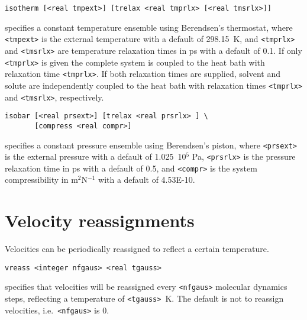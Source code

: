 \begin{description}

\item
\begin{verbatim}
isotherm [<real tmpext>] [trelax <real tmprlx> [<real tmsrlx>]]
\end{verbatim}
specifies a constant temperature ensemble using Berendsen's thermostat,
where \verb+<tmpext>+ is the external temperature with a default of 298.15~K,
and \verb+<tmprlx>+ and \verb+<tmsrlx>+ are temperature relaxation times in ps 
with a default of 0.1. If only \verb+<tmprlx>+ is given the complete system
is coupled to the heat bath with relaxation time \verb+<tmprlx>+. If both
relaxation times are supplied, solvent and solute are independently coupled
to the heat bath with relaxation times \verb+<tmprlx>+ and \verb+<tmsrlx>+,
respectively.

\item
\begin{verbatim}
isobar [<real prsext>] [trelax <real prsrlx> ] \
       [compress <real compr>]
\end{verbatim}
specifies a constant pressure ensemble using Berendsen's piston,
where \verb+<prsext>+ is the external pressure with a default of 1.025~10$^5$ Pa,
\verb+<prsrlx>+ is the pressure relaxation time in ps with a default of 0.5, and
\verb+<compr>+ is the system compressibility in m$^2$N$^{-1}$ with a
default of 4.53E-10.
\end{description}

\section{Velocity reassignments}
Velocities can be periodically reassigned to reflect a certain temperature.
\begin{description}
\item
\begin{verbatim}
vreass <integer nfgaus> <real tgauss>
\end{verbatim}
specifies that velocities will be reassigned every \verb+<nfgaus>+ molecular
dynamics steps, reflecting a temperature of \verb+<tgauss>+~K. The default
is not to reassign velocities, i.e.\ \verb+<nfgaus>+ is 0.
\end{description}

